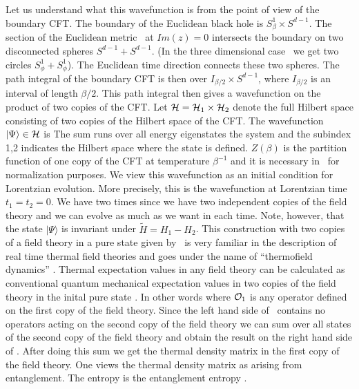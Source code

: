 \ifig{}
{}


Let us understand what this wavefunction is from the point of view
of the boundary CFT. The boundary of the Euclidean black hole 
is $S^1_\beta \times S^{d-1} $. The section of the 
 Euclidean metric
\btzmet\ at $Im(z)=0$ intersects the boundary on two disconnected
spheres $S^{d-1}  + S^{d-1} $. (In the three dimensional case \btzmet\
we get two circles  $S^1_\phi + S^1_\phi$). 
 The Euclidean time direction 
connects these two spheres. The path integral of the boundary CFT 
is then over $I_{\beta/2} \times S^{d-1}$, where $I_{\beta/2}$
is an interval of length $\beta/2$. This path integral 
 then gives a wavefunction on the product of two
copies of the CFT. Let ${\cal H} ={\cal H}_1 \times {\cal H}_2$
denote the full Hilbert space consisting of two copies of the 
Hilbert space of the CFT. The wavefunction
 $|\Psi \rangle \in {\cal H}$
is 
\eqn{}
The sum runs over all energy eigenstates  the system and the 
subindex 1,2 indicates the Hilbert space where the state is defined. 
 $Z(\beta)$ is the partition function 
of one copy of the CFT at temperature $\beta^{-1}$ and it is necessary in 
\wavefunction\ for normalization purposes.
We view this wavefunction as an initial condition for Lorentzian evolution. 
More precisely, this is the wavefunction at Lorentzian time 
$t_1=t_2 =0$. We have two times since we have two independent 
copies of the field theory and we can evolve as much as we want in
each time. Note, however, that the state $|\Psi \rangle$ is invariant
under $\tilde H = H_1 - H_2 $. 
This construction with two copies of a field theory in a pure state 
given by \wavefunction\ is very familiar in the description of 
real time thermal field theories and goes under the name of
``thermofield  dynamics'' \msh . 
Thermal expectation values in any  field theory can be calculated 
as conventional quantum mechanical expectation values in two copies
of the field theory in the inital pure state \wavefunction .
In other words 
\eqn\thermo{
\langle \Psi | {\cal O}_1 | \Psi \rangle = Tr[ \rho_\beta {\cal O}_1 ]
}
where ${\cal O}_1$ is any operator defined on the first copy of the
field theory. Since  the left hand side of \thermo\ contains 
no operators acting on the second copy 
of the field theory we can sum over all  states of the second copy
of the field theory and obtain 
the result on the right hand side of \thermo . 
After doing this sum we get the thermal 
density matrix in the first copy of the field theory. 
One views the thermal density matrix as arising from entanglement. 
The entropy is the entanglement entropy \msh . 



